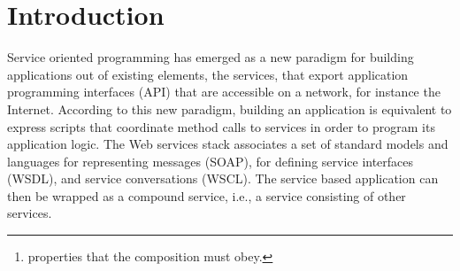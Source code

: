 \documentclass{sig-alternate}
\begin{document}
\maketitle
\begin{abstract}
This paper presents an extension of  the PEWS language, named $\pi$-PEWS, for
reliably composing web services using \textit{policies}\footnote{properties
that the composition must obey.}. The expression of policies adds non functional
properties to service compositions, such as atomicity, persistence or QoS. A $\pi$-PEWS program defines the  behaviour of a compound web
service as the combination of individual operations and conditions for
expressing non-functional and temporal constraints. $\pi$-PEWS includes
constructs for defining non-functional properties by means of conditions, to be checked at
runtime. Therefore, a new runtime system for the language has been specified,
taking into consideration the verification of policies and temporal conditions.
\end{abstract}




\section{Introduction}
\label{sec:intro}

Service oriented programming has emerged as a new paradigm for building applications out of existing elements, the services, that export application programming interfaces (API) that are accessible on a network, for instance the Internet. 
According to this new paradigm, building an application is equivalent to express scripts that coordinate method calls to services in order to program its application logic. 
The Web services stack associates a set of standard models and  languages for representing messages  (SOAP), for defining service interfaces (WSDL), and service conversations (WSCL). 
The service based application can then be wrapped as a compound service, i.e., a service consisting of other services. 
\end{document}
